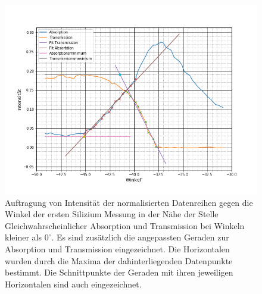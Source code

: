 \begin{figure}[h]
	\centering

	\includegraphics[scale=0.5]{Bilder/si_1_l}
	\caption[Geraden Anpassungen erste Silizium Messung links]{\small Auftragung von Intensität der normalisierten Datenreihen gegen die  Winkel der ersten Silizium Messung in der Nähe der Stelle Gleichwahrscheinlicher Absorption und Transmission bei Winkeln kleiner als $0^\circ$. Es sind zusätzlich die angepassten Geraden zur Absorption und Transmission eingezeichnet. Die Horizontalen wurden durch die Maxima der dahinterliegenden Datenpunkte bestimmt. Die Schnittpunkte der Geraden mit ihren jeweiligen Horizontalen sind auch eingezeichnet.}
	\label{si_1_l}
\end{figure}

